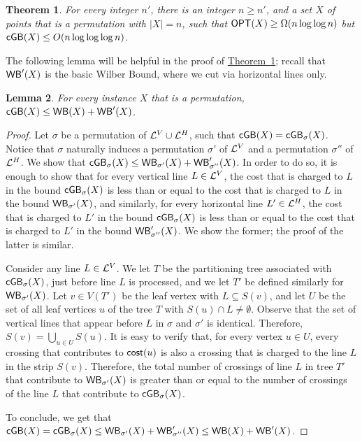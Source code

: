\documentclass[11pt]{article}
\numberwithin{equation}{section}
\newtheorem{theorem}{Theorem}[section]
\newtheorem{lemma}[theorem]{Lemma}
\theoremstyle{definition}
\theoremstyle{plain}
\newcommand{\expref}[2]{\hyperref[#2]{#1~\ref{#2}}}
\begin{document}
%


\begin{theorem}
	\label{thm:negative for XWB}
	For every integer $n'$, there is an integer $n\geq n'$, and a set $X$ of points that is a permutation with $|X|=n$, such that $\mbox{\sf OPT}(X)\geq \Omega(n\log\log n)$ but $\mathsf{cGB}(X)\leq O(n\log\log\log n)$.
\end{theorem}


%

%
%

The following lemma will be helpful in the proof of \expref{Theorem}{thm:negative for XWB}; recall that $\mathsf{WB}'(X)$ is the basic Wilber Bound, where we cut via horizontal lines only.

\begin{lemma}\label{lem: extended WB from vertical and horizontal}
	For every instance $X$ that is a permutation, $\mathsf{cGB}(X)\leq \mathsf{WB}(X)+\mathsf{WB}'(X)$.
\end{lemma}

\begin{proof}
	Let $\sigma$ be a permutation of ${\mathcal L}^V\cup {\mathcal L}^H$, such that $\mathsf{cGB}(X)=\mathsf{cGB}_{\sigma}(X)$. Notice that $\sigma$ naturally induces a permutation $\sigma'$ of ${\mathcal L}^V$ and a permutation $\sigma''$ of ${\mathcal L}^H$. We show that $\mathsf{cGB}_{\sigma}(X)\leq \mathsf{WB}_{\sigma'}(X)+\mathsf{WB}'_{\sigma''}(X)$. In order to do so, it is enough to show that for every vertical line $L\in {\mathcal L}^V$, the cost that is charged to $L$ in the bound $\mathsf{cGB}_{\sigma}(X)$ is less than or equal to the cost that is charged to $L$ in the bound $\mathsf{WB}_{\sigma'}(X)$, and similarly, for every horizontal line $L'\in {\mathcal L}^H$, the cost that is charged to $L'$ in the bound $\mathsf{cGB}_{\sigma}(X)$ is less than or equal to the cost that is charged to $L'$ in the bound $\mathsf{WB}'_{\sigma''}(X)$. We show the former; the proof of the latter is similar.
	
	Consider any line $L\in {\mathcal L}^V$. We let $T$ be the partitioning tree associated with $\mathsf{cGB}_{\sigma}(X)$, just before line $L$ is processed, and we let $T'$ be defined similarly for $\mathsf{WB}_{\sigma'}(X)$. Let $v\in V(T')$ be the leaf vertex with $L\subseteq S(v)$, and let $U$ be the set of all leaf vertices $u$ of the tree $T$ with $S(u)\cap L\neq \emptyset$. Observe that the set of vertical lines that appear before $L$ in $\sigma$ and $\sigma'$ is identical. Therefore, $S(v)=\bigcup_{u\in U}S(u)$. It is easy to verify that, for every vertex $u\in U$, every crossing that contributes to $\mathsf{cost}(u)$ is also a crossing that is charged to the line $L$ in the strip $S(v)$. Therefore, the total number of crossings of line $L$ in tree $T'$ that contribute to $\mathsf{WB}_{\sigma'}(X)$ is greater than or equal to the number of crossings of the line $L$ that contribute to $\mathsf{cGB}_{\sigma}(X)$.
	
	To conclude, we get that $\mathsf{cGB}(X)=\mathsf{cGB}_{\sigma}(X)\leq \mathsf{WB}_{\sigma'}(X)+\mathsf{WB}'_{\sigma''}(X)\leq \mathsf{WB}(X)+\mathsf{WB}'(X)$.
\end{proof}
 
\end{document}
